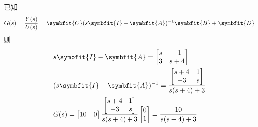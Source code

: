 \begin{exercise}
    已知
    \begin{equation*}
        G(s) = \frac{Y(s)}{U(s)} = \symbfit{C}(s\symbfit{I} - \symbfit{A})^{-1} \symbfit{B} + \symbfit{D}
    \end{equation*}
    则
    \begin{align*}
        &s\symbfit{I} - \symbfit{A} = \begin{bmatrix}
            s & -1 \\
            3 & s+4
        \end{bmatrix} \\
        &(s\symbfit{I} - \symbfit{A})^{-1} = \frac{\begin{bmatrix}
            s+4 & 1 \\
            -3 & s
        \end{bmatrix}}{s(s+4) + 3} \\
        &G(s) = \begin{bmatrix}
            10 & 0
        \end{bmatrix} \frac{\begin{bmatrix}
            s+4 & 1 \\
            -3 & s
        \end{bmatrix}}{s(s+4) + 3} \begin{bmatrix}
            0 \\
            1
        \end{bmatrix} = \frac{10}{s(s+4) + 3}
    \end{align*}
\end{exercise}

